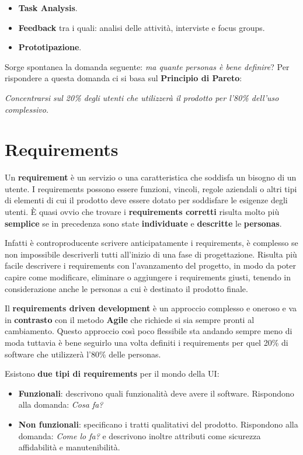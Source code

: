 \begin{itemize}
	\item \textbf{Task Analysis}.
	\item \textbf{Feedback} tra i quali: analisi delle attività, interviste e focus groups.
	\item \textbf{Prototipazione}.
\end{itemize}

Sorge spontanea la domanda seguente: \textit{ma quante personas è bene definire}?
Per rispondere a questa domanda ci si basa sul \textbf{Principio di Pareto}: \begin{center}
	\textit{Concentrarsi sul 20\% degli utenti che utilizzerà il prodotto per l'80\% dell'uso complessivo.}
\end{center}

\pagebreak

\section{Requirements}

Un \textbf{requirement} è un servizio o una caratteristica che soddisfa un bisogno di un utente.
I requirements possono essere funzioni, vincoli, regole aziendali o altri tipi di elementi di cui il prodotto deve essere dotato per soddisfare le esigenze degli utenti. È quasi ovvio che trovare i \textbf{requirements corretti} risulta molto più \textbf{semplice} se in precedenza sono state \textbf{individuate} e \textbf{descritte} le \textbf{personas}.

Infatti è controproducente scrivere anticipatamente i requirements,
è complesso se non impossibile descriverli tutti all'inizio di una fase di progettazione. Risulta più facile descrivere i requirements con l'avanzamento del progetto, in modo da poter capire come modificare, eliminare o aggiungere i requirements giusti, tenendo in considerazione anche le personas a cui è destinato il prodotto finale.

Il \textbf{requirements driven development} è un approccio complesso e oneroso e va in \textbf{contrasto} con il metodo \textbf{Agile} che richiede si sia sempre pronti al cambiamento. Questo approccio così poco flessibile sta andando sempre meno di moda tuttavia è bene seguirlo una volta definiti i requirements per quel 20\% di software che utilizzerà l'80\% delle personas.

Esistono \textbf{due tipi di requirements} per il mondo della UI:

\begin{itemize}
	\item \textbf{Funzionali}:
	      descrivono quali funzionalità deve avere il software. Rispondono alla domanda:
	      \textit{Cosa fa?}
	\item \textbf{Non funzionali}: specificano i tratti qualitativi del prodotto. Rispondono alla domanda: \textit{Come lo fa?} e descrivono inoltre
	      attributi come sicurezza affidabilità e manutenibilità.
\end{itemize}

